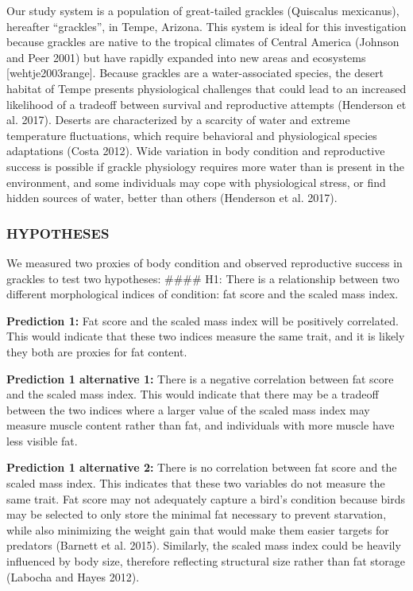 \documentclass[
]{article}
\begin{document}
Our study system is a population of great-tailed grackles (Quiscalus
mexicanus), hereafter ``grackles'', in Tempe, Arizona. This system is
ideal for this investigation because grackles are native to the tropical
climates of Central America (Johnson and Peer 2001) but have rapidly
expanded into new areas and ecosystems {[}wehtje2003range{]}. Because
grackles are a water-associated species, the desert habitat of Tempe
presents physiological challenges that could lead to an increased
likelihood of a tradeoff between survival and reproductive attempts
(Henderson et al. 2017). Deserts are characterized by a scarcity of
water and extreme temperature fluctuations, which require behavioral and
physiological species adaptations (Costa 2012). Wide variation in body
condition and reproductive success is possible if grackle physiology
requires more water than is present in the environment, and some
individuals may cope with physiological stress, or find hidden sources
of water, better than others (Henderson et al. 2017).

\hypertarget{hypotheses}{%
\subsubsection{HYPOTHESES}\label{hypotheses}}

We measured two proxies of body condition and observed reproductive
success in grackles to test two hypotheses: \#\#\#\# H1: There is a
relationship between two different morphological indices of condition:
fat score and the scaled mass index.

\textbf{Prediction 1:} Fat score and the scaled mass index will be
positively correlated. This would indicate that these two indices
measure the same trait, and it is likely they both are proxies for fat
content.

\textbf{Prediction 1 alternative 1:} There is a negative correlation
between fat score and the scaled mass index. This would indicate that
there may be a tradeoff between the two indices where a larger value of
the scaled mass index may measure muscle content rather than fat, and
individuals with more muscle have less visible fat.

\textbf{Prediction 1 alternative 2:} There is no correlation between fat
score and the scaled mass index. This indicates that these two variables
do not measure the same trait. Fat score may not adequately capture a
bird's condition because birds may be selected to only store the minimal
fat necessary to prevent starvation, while also minimizing the weight
gain that would make them easier targets for predators (Barnett et al.
2015). Similarly, the scaled mass index could be heavily influenced by
body size, therefore reflecting structural size rather than fat storage
(Labocha and Hayes 2012).
\end{document}
